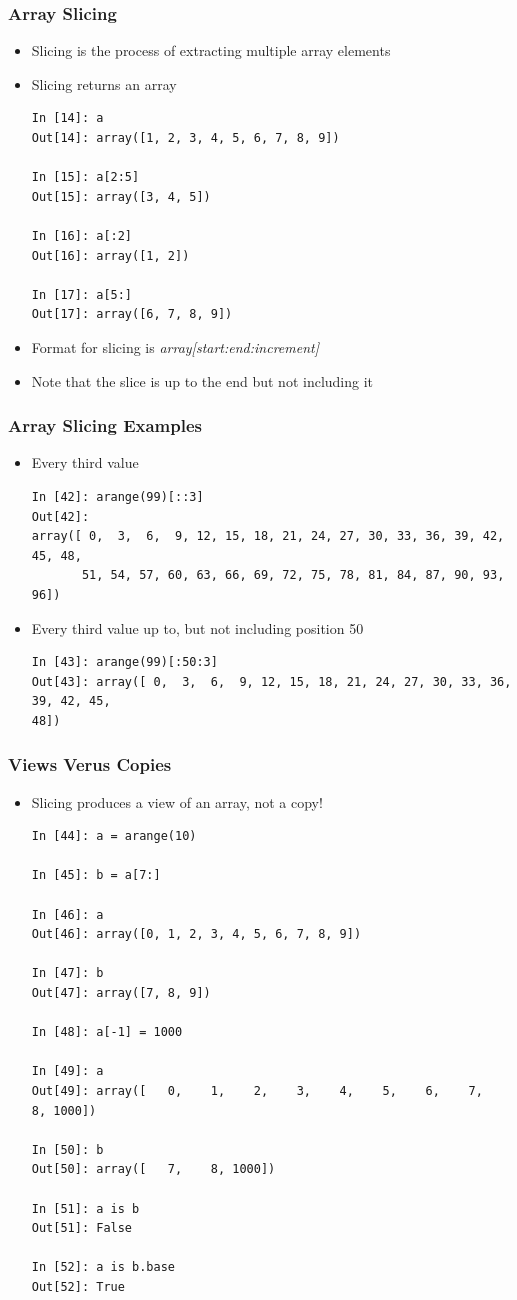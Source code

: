 \documentclass{beamer}
\begin{document}
\begin{frame}[fragile]
\frametitle{Array Slicing}
  \begin{itemize}
    \item{Slicing is the process of extracting multiple array elements}
    \item{Slicing returns an array}
    \begin{lstlisting}
In [14]: a
Out[14]: array([1, 2, 3, 4, 5, 6, 7, 8, 9])

In [15]: a[2:5]
Out[15]: array([3, 4, 5])

In [16]: a[:2]
Out[16]: array([1, 2])

In [17]: a[5:]
Out[17]: array([6, 7, 8, 9])
    \end{lstlisting}
    \item{Format for slicing is \emph{array[start:end:increment]}}
    \item{Note that the slice is up to the end but not including it}
  \end{itemize}
\end{frame}


\begin{frame}[fragile]
\frametitle{Array Slicing Examples}
  \begin{itemize}
    \item{Every third value}
    \begin{lstlisting}
In [42]: arange(99)[::3]
Out[42]:
array([ 0,  3,  6,  9, 12, 15, 18, 21, 24, 27, 30, 33, 36, 39, 42, 45, 48,
       51, 54, 57, 60, 63, 66, 69, 72, 75, 78, 81, 84, 87, 90, 93, 96])
    \end{lstlisting}
    \item{Every third value up to, but not including position 50}
    \begin{lstlisting}
In [43]: arange(99)[:50:3]
Out[43]: array([ 0,  3,  6,  9, 12, 15, 18, 21, 24, 27, 30, 33, 36, 39, 42, 45,
48])
    \end{lstlisting}
  \end{itemize}
\end{frame}


\begin{frame}[fragile]
\frametitle{Views Verus Copies}
  \begin{itemize}
    \item{Slicing produces a view of an array, not a copy!}
    \begin{lstlisting}
In [44]: a = arange(10)

In [45]: b = a[7:]

In [46]: a
Out[46]: array([0, 1, 2, 3, 4, 5, 6, 7, 8, 9])

In [47]: b
Out[47]: array([7, 8, 9])

In [48]: a[-1] = 1000

In [49]: a
Out[49]: array([   0,    1,    2,    3,    4,    5,    6,    7,    8, 1000])

In [50]: b
Out[50]: array([   7,    8, 1000])

In [51]: a is b
Out[51]: False

In [52]: a is b.base
Out[52]: True
    \end{lstlisting}
  \end{itemize}
\end{frame}
\end{document}

